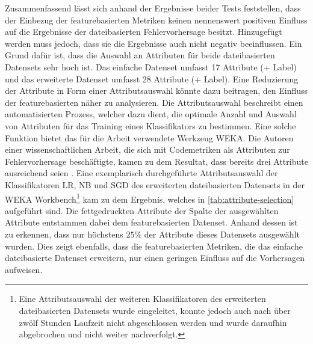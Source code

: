 Zusammenfassend lässt sich anhand der Ergebnisse beider Tests feststellen, dass der Einbezug der featurebasierten Metriken keinen nennenswert positiven Einfluss auf die Ergebnisse der dateibasierten Fehlervorhersage besitzt. Hinzugefügt werden muss jedoch, dass sie die Ergebnisse auch nicht negativ beeinflussen. Ein Grund dafür ist, dass die Auswahl an Attributen für beide dateibasierten Datensets sehr hoch ist. Das \glqq einfache\grqq{} Datenset umfasst 17 Attribute (+ Label) und das erweiterte Datenset umfasst 28 Attribute (+ Label). Eine Reduzierung der Attribute in Form einer Attributsauswahl könnte dazu beitragen, den Einfluss der featurebasierten näher zu analysieren. Die Attributsauswahl beschreibt einen automatisierten Prozess, welcher dazu dient, die optimale Anzahl und Auswahl von Attributen für das Training eines Klassifikators zu bestimmen. Eine solche Funktion bietet das für die Arbeit verwendete Werkzeug WEKA. Die Autoren einer wissenschaftlichen Arbeit, die sich mit Codemetriken als Attributen zur Fehlervorhersage beschäftigte, kamen zu dem Resultat, dass bereits drei Attribute ausreichend seien \cite{Wang2011}. Eine exemplarisch durchgeführte Attributsauswahl der Klassifikatoren LR, NB und SGD des erweiterten dateibasierten Datensets in der WEKA Workbench\footnote{Eine Attributsauswahl der weiteren Klassifikatoren des erweiterten dateibasierten Datensets wurde eingeleitet, konnte jedoch auch nach über zwölf Stunden Laufzeit nicht abgeschlossen werden und wurde daraufhin abgebrochen und nicht weiter nachverfolgt.} kam zu dem Ergebnis, welches in \autoref{tab:attribute-selection} aufgeführt sind. Die fettgedruckten Attribute der Spalte der ausgewählten Attribute entstammen dabei dem featurebasierten Datenset. Anhand dessen ist zu erkennen, dass nur höchstens $25\%$ der Attribute dieses Datensets ausgewählt wurden. Dies zeigt ebenfalls, dass die featurebasierten Metriken, die das \glqq einfache\grqq{} dateibasierte Datenset erweitern, nur einen geringen Einfluss auf die Vorhersagen aufweisen.

